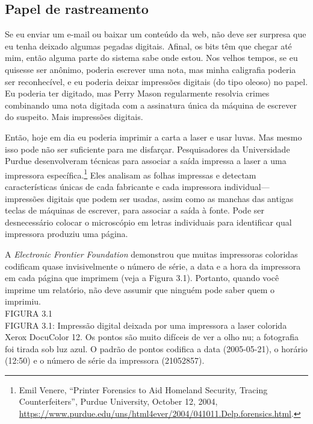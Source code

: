 \documentclass{book}
\newcommand{\ingles}[1]{\textit{#1}}
\begin{document}
\subsection{Papel de rastreamento}
\label{pegadas:papel}
Se eu enviar um e-mail ou baixar um conteúdo da web, não deve ser surpresa que eu
tenha deixado algumas pegadas digitais. Afinal, os bits têm que chegar até mim,
então alguma parte do sistema sabe onde estou. Nos velhos tempos, se eu quisesse
ser anônimo, poderia escrever uma nota, mas minha caligrafia poderia ser reconhecível,
e eu poderia deixar impressões digitais (do tipo oleoso) no papel. Eu poderia ter
digitado, mas Perry Mason regularmente resolvia crimes combinando uma nota digitada
com a assinatura única da máquina de escrever do suspeito. Mais impressões digitais.

Então, hoje em dia eu poderia imprimir a carta a laser e usar luvas. Mas mesmo isso
pode não ser suficiente para me disfarçar. Pesquisadores da Universidade Purdue
desenvolveram técnicas para associar a saída impressa a laser a uma impressora
específica.\footnote{Emil Venere, ``Printer Forensics to Aid Homeland Security,
Tracing Counterfeiters'', Purdue University, October 12, 2004,
\url{https://www.purdue.edu/uns/html4ever/2004/041011.Delp.forensics.html}.}
Eles analisam as folhas impressas e detectam características únicas de
cada fabricante e cada impressora individual---impressões digitais que podem ser
usadas, assim como as manchas das antigas teclas de máquinas de escrever, para
associar a saída à fonte. Pode ser desnecessário colocar o microscópio em letras
individuais para identificar qual impressora produziu uma página.

A \ingles{Electronic Frontier Foundation} demonstrou que muitas impressoras
coloridas codificam quase invisivelmente o número de série, a data e a hora da
impressora em cada página que imprimem (veja a Figura 3.1). Portanto, quando
você imprime um relatório, não deve assumir que ninguém pode saber quem o imprimiu.\\

FIGURA 3.1\\

FIGURA 3.1: Impressão digital deixada por uma impressora a laser colorida Xerox
DocuColor 12. Os pontos são muito difíceis de ver a olho nu; a fotografia foi
tirada sob luz azul. O padrão de pontos codifica a data (2005-05-21), o horário
(12:50) e o número de série da impressora (21052857).
\end{document}

